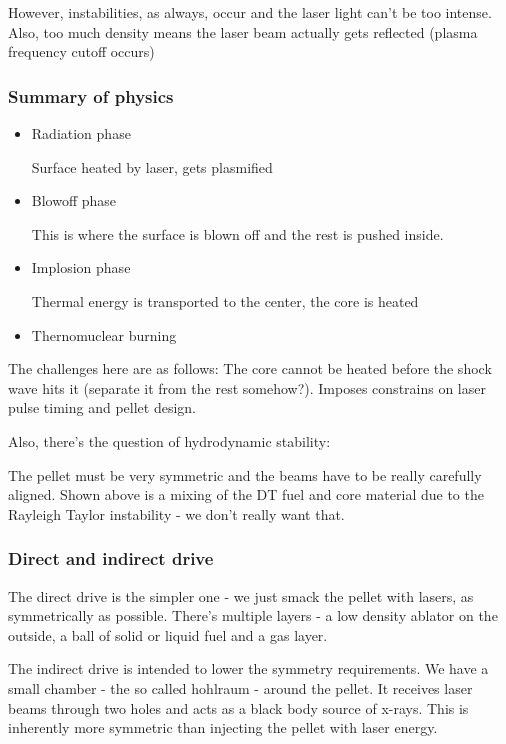 \documentclass[PlasmaNotes.tex]{subfiles}
\begin{document}
However, instabilities, as always, occur and the laser light can't be too intense. Also, too much density means the laser beam actually gets reflected (plasma frequency cutoff occurs)

\subsubsection{Summary of physics}

\begin{itemize}
 \item Radiation phase
 
 Surface heated by laser, gets plasmified
 \item Blowoff phase
 
 This is where the surface is blown off and the rest is pushed inside.
 
 \item Implosion phase
 
 Thermal energy is transported to the center, the core is heated
 
 \item Thernomuclear burning
 
\end{itemize}

The challenges here are as follows: The core cannot be heated before the shock wave hits it (separate it from the rest somehow?). Imposes constrains on laser pulse timing and pellet design.

Also, there's the question of hydrodynamic stability:


The pellet must be very symmetric and the beams have to be really carefully aligned. Shown above is a mixing of the DT fuel and core material due to the Rayleigh Taylor instability - we don't really want that.

\subsubsection{Direct and indirect drive}

The direct drive is the simpler one - we just smack the pellet with lasers, as symmetrically as possible. There's multiple layers - a low density ablator on the outside, a ball of solid or liquid fuel and a gas layer.

The indirect drive is intended to lower the symmetry requirements. We have a small chamber - the so called hohlraum - around the pellet. It receives laser beams through two holes and acts as a black body source of x-rays. This is inherently more symmetric than injecting the pellet with laser energy.
\end{document}
